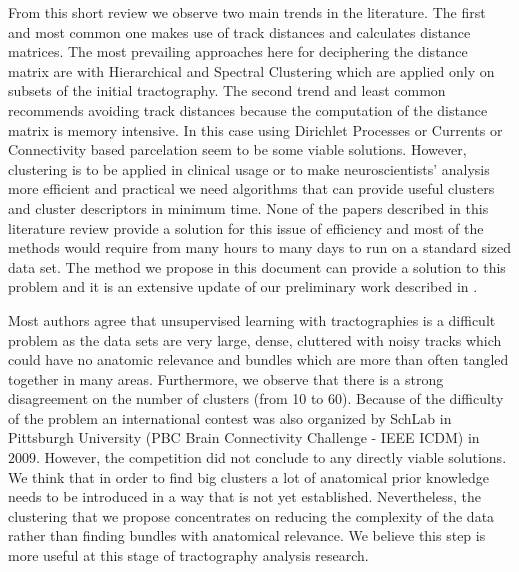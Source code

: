 \documentclass{bioinfo}
\begin{document}
From this short review we observe two main trends in the literature.
The first and most common one makes use of track distances and
calculates distance matrices. The most prevailing approaches here for
deciphering the distance matrix are with Hierarchical and Spectral
Clustering which are applied only on subsets of the initial
tractography. The second trend and least common recommends avoiding
track distances because the computation of the distance matrix is memory
intensive.  In this case using Dirichlet Processes or Currents or
Connectivity based parcelation seem to be some viable
solutions. However, clustering is to be applied in clinical usage or to
make neuroscientists' analysis more efficient and practical we need
algorithms that can provide useful clusters and cluster descriptors in
minimum time. None of the papers described in this literature review
provide a solution for this issue of efficiency and most of the methods
would require from many hours to many days to run on a standard sized
data set. The method we propose in this document can provide a solution
to this problem and it is an extensive update of our preliminary work
described in \citet{EGMB10}.

Most authors agree that unsupervised learning with tractographies is a
difficult problem as the data sets are very large, dense, cluttered with
noisy tracks which could have no anatomic relevance and bundles which
are more than often tangled together in many areas. Furthermore, we
observe that there is a strong disagreement on the number of clusters
(from 10 to 60). Because of the difficulty of the problem an
international contest was also organized by SchLab in Pittsburgh
University (PBC Brain Connectivity Challenge - IEEE ICDM) in
$2009$. However, the competition did not conclude to any directly viable
solutions. We think that in order to find big clusters a lot of
anatomical prior knowledge needs to be introduced in a way that is not
yet established.  Nevertheless, the clustering that we propose
concentrates on reducing the complexity of the data rather than finding
bundles with anatomical relevance. We believe this step is more useful
at this stage of tractography analysis research.
\end{document}

